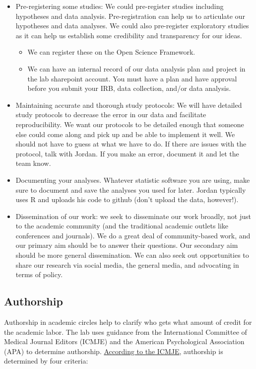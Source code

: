 \documentclass[
]{book}
\providecommand{\tightlist}{%
  \setlength{\itemsep}{0pt}\setlength{\parskip}{0pt}}
\begin{document}
\begin{itemize}
\tightlist
\item
  Pre-registering some studies: We could pre-register studies including hypotheses and data analysis. Pre-registration can help us to articulate our hypotheses and data analyses. We could also pre-register exploratory studies as it can help us establish some credibility and transparency for our ideas.

  \begin{itemize}
  \tightlist
  \item
    We can register these on the Open Science Framework.
  \item
    We can have an internal record of our data analysis plan and project in the lab sharepoint account. You must have a plan and have approval before you submit your IRB, data collection, and/or data analysis.
  \end{itemize}
\item
  Maintaining accurate and thorough study protocols: We will have detailed study protocols to decrease the error in our data and facilitate reproducibility. We want our protocols to be detailed enough that someone else could come along and pick up and be able to implement it well. We should not have to guess at what we have to do. If there are issues with the protocol, talk with Jordan. If you make an error, document it and let the team know.
\item
  Documenting your analyses. Whatever statistic software you are using, make sure to document and save the analyses you used for later. Jordan typically uses R and uploads his code to github (don't upload the data, however!).
\item
  Dissemination of our work: we seek to disseminate our work broadly, not just to the academic community (and the traditional academic outlets like conferences and journals). We do a great deal of community-based work, and our primary aim should be to answer their questions. Our secondary aim should be more general dissemination. We can also seek out opportunities to share our research via social media, the general media, and advocating in terms of policy.
\end{itemize}

\hypertarget{authorship}{%
\subsection{Authorship}\label{authorship}}

Authorship in academic circles help to clarify who gets what amount of credit for the academic labor. The lab uses guidance from the International Committee of Medical Journal Editors (ICMJE) and the American Psychological Association (APA) to determine authorship. \href{https://www.icmje.org/recommendations/browse/roles-and-responsibilities/defining-the-role-of-authors-and-contributors.html}{According to the ICMJE}, authorship is determined by four criteria:
\end{document}
